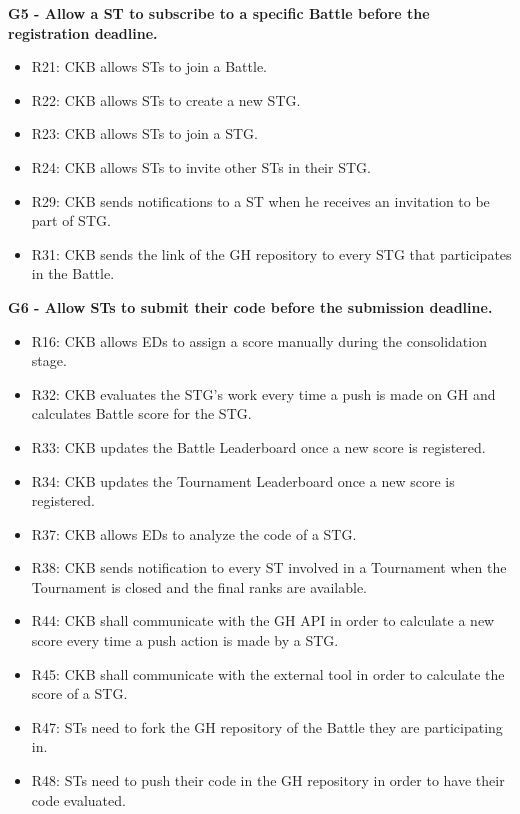 \vspace{1.5cm}
\textbf{G5 - Allow a ST to subscribe to a specific Battle before the registration deadline.}
\begin{itemize}
    \item R21: CKB allows STs to join a Battle.
    \item R22: CKB allows STs to create a new STG.
    \item R23: CKB allows STs to join a STG.
    \item R24: CKB allows STs to invite other STs in their STG.
    \item R29: CKB sends notifications to a ST when he receives an invitation to be part of STG.
    \item R31: CKB sends the link of the GH repository to every STG that participates in the Battle.
\end{itemize}


\vspace{1.5cm}
\textbf{G6 - Allow STs to submit their code before the submission deadline.}
\begin{itemize}
    \item R16: CKB allows EDs to assign a score manually during the consolidation stage.
    \item R32: CKB evaluates the STG's work every time a push is made on GH and calculates Battle score for the STG.
    \item R33: CKB updates the Battle Leaderboard once a new score is registered.
    \item R34: CKB updates the Tournament Leaderboard once a new score is registered.
    \item R37: CKB allows EDs to analyze the code of a STG.
    \item R38: CKB sends notification to every ST involved in a Tournament when the Tournament is closed and the final ranks are available.
    \item R44: CKB shall communicate with the GH API in order to calculate a new score every time a push action is made by a STG.
    \item R45: CKB shall communicate with the external tool in order to calculate the score of a STG.
    \item R47: STs need to fork the GH repository of the Battle they are participating in.
    \item R48: STs need to push their code in the GH repository in order to have their code evaluated.
\end{itemize}


